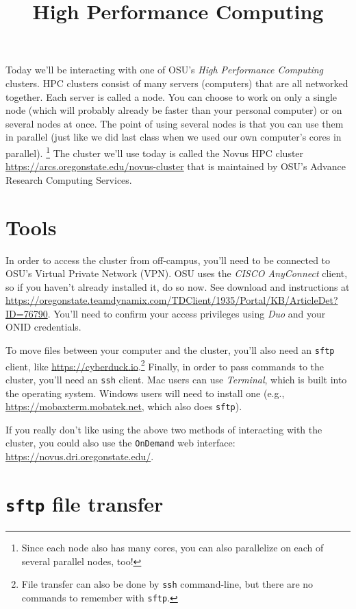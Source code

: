 \documentclass[12pt,letterpaper]{article}
\title{High Performance Computing}
\author{}
\date{}
\begin{document}
\maketitle
\tableofcontents

\clearpage

Today we'll be interacting with one of OSU's \emph{High Performance Computing} clusters.
HPC clusters consist of many servers (computers) that are all networked together.
Each server is called a node.
You can choose to work on only a single node
(which will probably already be faster than your personal computer)
or on several nodes at once.
The point of using several nodes is that you can use them in parallel
(just like we did last class when we used our own computer's cores in parallel).
\unskip
\footnote{Since each node also has many cores, you can also parallelize on each of several parallel nodes, too!}
The cluster we'll use today is called the Novus HPC cluster \url{https://arcs.oregonstate.edu/novus-cluster} that is maintained by OSU's Advance Research Computing Services.

\section{Tools}
In order to access the cluster from off-campus, you'll need to be connected to OSU's Virtual Private
Network (VPN).
OSU uses the \emph{CISCO AnyConnect} client, so if you haven't already installed it, do so now.
See download and instructions at
\url{https://oregonstate.teamdynamix.com/TDClient/1935/Portal/KB/ArticleDet?ID=76790}.
You'll need to confirm your access privileges using \emph{Duo} and your ONID credentials.

To move files between your computer and the cluster,
you'll also need an \texttt{sftp} client, like \url{https://cyberduck.io}.\footnote{File transfer can also be done by
\texttt{ssh} command-line, but there are no commands to remember with \texttt{sftp}.}
Finally, in order to pass commands to the cluster, you'll need an \texttt{ssh} client.
Mac users can use \emph{Terminal}, which is built into the operating system.
Windows users will need to install one (e.g., \url{https://mobaxterm.mobatek.net}, which also does
\texttt{sftp}).

If you really don't like using the above two methods of interacting with the cluster, you could also use the \texttt{OnDemand} web interface: \url{https://novus.dri.oregonstate.edu/}.




\section{\texttt{sftp} file transfer}
\end{document}
